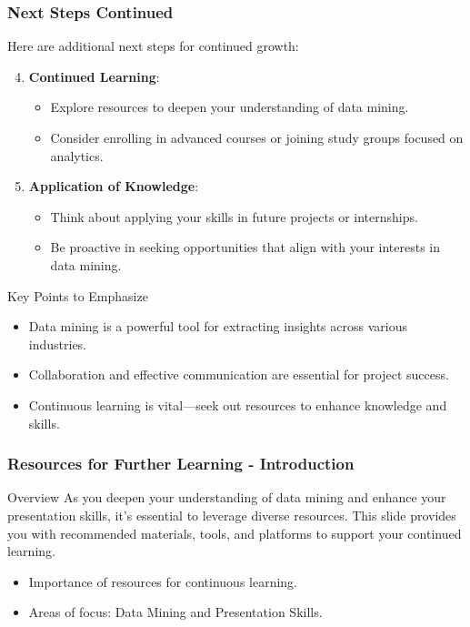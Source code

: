 \documentclass[aspectratio=169]{beamer}
\begin{document}
\begin{frame}[fragile]
    \frametitle{Next Steps Continued}
    
    Here are additional next steps for continued growth:
    
    \begin{enumerate}
        \setcounter{enumi}{3}
        \item \textbf{Continued Learning}:
        \begin{itemize}
            \item Explore resources to deepen your understanding of data mining.
            \item Consider enrolling in advanced courses or joining study groups focused on analytics.
        \end{itemize}
        
        \item \textbf{Application of Knowledge}:
        \begin{itemize}
            \item Think about applying your skills in future projects or internships.
            \item Be proactive in seeking opportunities that align with your interests in data mining.
        \end{itemize}
    \end{enumerate}

    \begin{block}{Key Points to Emphasize}
        \begin{itemize}
            \item Data mining is a powerful tool for extracting insights across various industries.
            \item Collaboration and effective communication are essential for project success.
            \item Continuous learning is vital—seek out resources to enhance knowledge and skills.
        \end{itemize}
    \end{block}
\end{frame}

\begin{frame}[fragile]
    \frametitle{Resources for Further Learning - Introduction}
    \begin{block}{Overview}
        As you deepen your understanding of data mining and enhance your presentation skills, it's essential to leverage diverse resources. This slide provides you with recommended materials, tools, and platforms to support your continued learning.
    \end{block}
    \begin{itemize}
        \item Importance of resources for continuous learning.
        \item Areas of focus: Data Mining and Presentation Skills.
    \end{itemize}
\end{frame}
\end{document}
